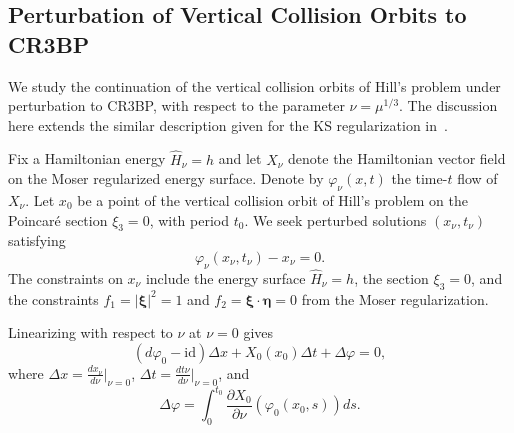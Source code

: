 \documentclass[pdflatex,sn-mathphys-ay]{sn-jnl}%
\theoremstyle{thmstyleone}%
\theoremstyle{thmstyletwo}%
\theoremstyle{thmstylethree}%
\renewcommand{\phi}{\varphi}
\begin{document}
\subsection{Perturbation of Vertical Collision Orbits to CR3BP}
\label{sec:collision-perturbation}
We study the continuation of the vertical collision orbits of Hill's problem under perturbation to CR3BP, with respect to the parameter $\nu=\mu^{1/3}$.
The discussion here extends the similar description given for the KS regularization in~\cite[Section 2.3.6]{gomez_llibre_martinez_simo_dynamics_vol1}.

Fix a Hamiltonian energy $\hat{H}_\nu = h$ and let $X_\nu$ denote the Hamiltonian vector field on the Moser regularized energy surface. Denote by $\phi_\nu(x, t)$ the time-$t$ flow of $X_\nu$.
Let $x_0$ be a point of the vertical collision orbit of Hill's problem on the Poincar\'e section $\xi_3=0$, with period $t_0$. We seek perturbed solutions $(x_\nu, t_\nu)$ satisfying 
\begin{equation*}
    \phi_\nu(x_\nu, t_\nu) - x_\nu = 0.
\end{equation*}
The constraints on $x_\nu$ include the energy surface $\hat{H}_\nu = h$, the section $\xi_3=0$, and the constraints $f_1 = |\boldsymbol{\xi}|^2 = 1$ and $f_2 = \boldsymbol{\xi}\cdot\boldsymbol{\eta} = 0$ from the Moser regularization.

Linearizing with respect to $\nu$ at $\nu=0$ gives
\begin{equation}
    \label{eqn:perturbed-linearized}
    (d\phi_0 - \text{id}) \Delta x + X_0(x_0) \Delta t + \Delta \phi = 0,
\end{equation}
where $\Delta x = \frac{d x_\nu}{d\nu}\big|_{\nu=0}$, $\Delta t = \frac{d t\nu}{d\nu}\big|_{\nu=0}$, and
\begin{equation*}
\Delta \phi = \int_0^{t_0} \frac{\partial X_0}{\partial \nu}(\phi_0(x_0, s)) ds.
\end{equation*}
\end{document}
